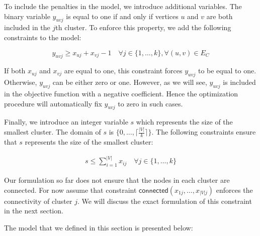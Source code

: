 \documentclass[conference,compsoc]{IEEEtran}
\begin{document}
To include the penalties in the model, we introduce additional
variables. The binary variable $y_{uvj}$ is equal to one if and only if
vertices $u$ and $v$ are both included in the $j$th cluster. To enforce
this property, we add the following constraints to the model:

\begin{equation}
y_{uvj} \geq x_{uj} + x_{vj} -1 \quad \forall j \in \{1, \ldots, k\}, \forall (u, v) \in E_{C}
\end{equation}

If both $x_{uj}$ and $x_{vj}$ are equal to one, this constraint forces
$y_{uvj}$ to be equal to one. Otherwise, $y_{uvj}$ can be either zero or
one. However, as we will see, $y_{uvj}$ is included in the objective
function with a negative coefficient. Hence the optimization procedure
will automatically fix $y_{uvj}$ to zero in such cases.

Finally, we introduce an integer variable $s$ which represents the size
of the smallest cluster. The domain of $s$ is
$\{0, \ldots, \lceil \frac{|V|}{k} \rceil \}$. The following constraints
ensure that $s$ represents the size of the smallest cluster:

\begin{align}
s \leq \sum_{i=1}^{|V|} x_{ij} \quad \forall j \in \{1, \ldots, k\}
\end{align}

Our formulation so far does not ensure that the nodes in each cluster
are connected. For now assume that constraint
$\mathsf{connected}(x_{1j}, \ldots, x_{|V|j})$ enforces the connectivity of
cluster $j$. We will discuss the exact formulation of this constraint in
the next section. 

The model that we defined in this section is presented
below:
\end{document}

